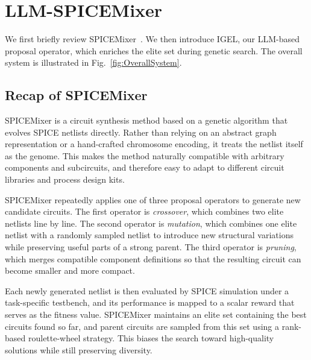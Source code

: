 \documentclass[sigconf,pbalance]{acmart_modified}
\newcommand{\squeezeSection}{}
\newcommand{\squeezeSubSection}{}
\newcommand{\llmspm}{LLM-SPICE\-Mixer}
\newcommand{\spm}{SPICE\-Mixer}
\begin{document}
\squeezeSection\section{\llmspm{}}
\label{sec:llm_spicemixer}
We first briefly review \spm{}~\cite{uhlich2025spicemixer}. We then introduce IGEL, our LLM-based proposal operator, which enriches the elite set during genetic search. The overall system is illustrated in Fig.~\ref{fig:OverallSystem}.

\squeezeSubSection\subsection{Recap of \spm{}}
\label{subsec:spicemixer:sec:llm_spicemixer}
\spm{} is a circuit synthesis method based on a genetic algorithm that evolves SPICE netlists directly. Rather than relying on an abstract graph representation or a hand-crafted chromosome encoding, it treats the netlist itself as the genome. This makes the method naturally compatible with arbitrary components and subcircuits, and therefore easy to adapt to different circuit libraries and process design kits.

\spm{} repeatedly applies one of three proposal operators to generate new candidate circuits. The first operator is \emph{crossover}, which combines two elite netlists line by line. The second operator is \emph{mutation}, which combines one elite netlist with a randomly sampled netlist to introduce new structural variations while preserving useful parts of a strong parent. The third operator is \emph{pruning}, which merges compatible component definitions so that the resulting circuit can become smaller and more compact.

Each newly generated netlist is then evaluated by SPICE simulation under a task-specific testbench, and its performance is mapped to a scalar reward that serves as the fitness value. \spm{} maintains an elite set containing the best circuits found so far, and parent circuits are sampled from this set using a rank-based roulette-wheel strategy. This biases the search toward high-quality solutions while still preserving diversity.
\end{document}
